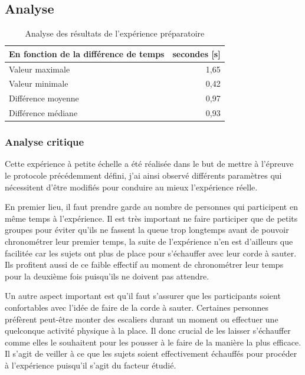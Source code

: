 \documentclass[12pt,fleqn,oneside,french,openany]{book} %
\begin{document}
\subsection{Analyse} \label{ssec:analyse2.1}

\begin{table}[h]
	\centering
	\caption{Analyse des résultats de l'expérience préparatoire} \label{tbl:analyse2.1}
	\begin{tabular}{lr}
		\toprule 
		\textbf{En fonction de la différence de temps} & \textbf{secondes [s]} \\ \midrule
		Valeur maximale & 1,65 \\
		Valeur minimale & 0,42 \\
		Différence moyenne & 0,97 \\
		Différence médiane & 0,93 \\ \bottomrule
	\end{tabular}
\end{table}

\subsubsection{Analyse critique} \label{sssec:analyseCrit2.1}
Cette expérience à petite échelle a été réalisée dans le but de mettre à l'épreuve le protocole précédemment défini, j'ai ainsi observé différents paramètres qui nécessitent d'être modifiés pour conduire au mieux l'expérience réelle. 

En premier lieu, il faut prendre garde au nombre de personnes qui participent en même temps à l'expérience. Il est très important ne faire participer que de petits groupes pour éviter qu'ils ne fassent la queue trop longtemps avant de pouvoir chronométrer leur premier temps, la suite de l'expérience n'en est d'ailleurs que facilitée car les sujets ont plus de place pour s'échauffer avec leur corde à sauter. Ils profitent aussi de ce faible effectif au moment de chronométrer leur temps pour la deuxième fois puisqu'ils ne doivent pas attendre.

Un autre aspect important est qu'il faut s'assurer que les participants soient confortables avec l'idée de faire de la corde à sauter. Certaines personnes préfèrent peut-être monter des escaliers durant un moment ou effectuer une quelconque activité physique à la place. Il donc crucial de les laisser s'échauffer comme elles le souhaitent pour les pousser à le faire de la manière la plus efficace. Il s'agit de veiller à ce que les sujets soient effectivement échauffés pour procéder à l'expérience puisqu'il s'agit du facteur étudié.
\end{document}
